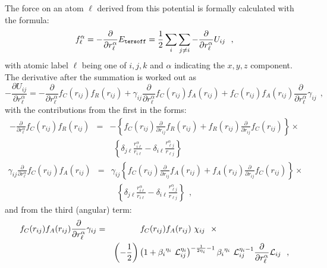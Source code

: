 The force on an atom $\ell$ derived from this potential is
formally calculated with the formula:
\begin{equation}
f_{\ell}^{\alpha} = -\frac{\partial}{\partial r_{\ell}^{\alpha}}
E_{\tt tersoff} = \frac{1}{2} \sum_{i}\sum_{j \neq i}
-\frac{\partial}{\partial r_{\ell}^{\alpha}} U_{ij}~~,
\end{equation}
with atomic label $\ell$ being one of $i,j,k$ and $\alpha$
indicating the $x,y,z$ component.  The derivative after the
summation is worked out as
\begin{equation}
-\frac{\partial U_{ij}}{\partial r_{\ell}^{\alpha}} =
-\frac{\partial}{\partial r_{\ell}^{\alpha}} f_{C}(r_{ij}) f_{R}(r_{ij}) +
 \gamma_{ij} \frac{\partial}{\partial r_{\ell}^{\alpha}} f_{C}(r_{ij}) f_{A}(r_{ij}) +
 f_{C}(r_{ij}) f_{A}(r_{ij}) \frac{\partial}{\partial r_{\ell}^{\alpha}} \gamma_{ij}~~,
\end{equation}
with the contributions from the first in the forms:
\begin{eqnarray}
-\frac{\partial}{\partial r_{\ell}^{\alpha}} f_{C}(r_{ij}) f_{R}(r_{ij})&=&
-\left\{ f_{C}(r_{ij}) \frac{\partial}{\partial r_{ij}} f_{R}(r_{ij}) +
f_{R}(r_{ij}) \frac{\partial}{\partial r_{ij}} f_{C}(r_{ij}) \right\} \times \nonumber \\
& & ~~\left\{ \delta_{j \ell} \frac{r_{i \ell}^{\alpha}}{r_{i \ell}} -
\delta_{i \ell} \frac{r_{\ell j}^{\alpha}}{r_{\ell j}} \right\}
\end{eqnarray}
\begin{eqnarray}
\gamma_{ij} \frac{\partial}{\partial r_{\ell}^{\alpha}} f_{C}(r_{ij}) f_{A}(r_{ij})&=&
\gamma_{ij} \left\{ f_{C}(r_{ij}) \frac{\partial}{\partial r_{ij}} f_{A}(r_{ij}) +
f_{A}(r_{ij}) \frac{\partial}{\partial r_{ij}} f_{C}(r_{ij}) \right\} \times \nonumber \\
& & ~~~\left\{ \delta_{j \ell} \frac{r_{i \ell}^{\alpha}}{r_{i \ell}} -
\delta_{i \ell} \frac{r_{\ell j}^{\alpha}}{r_{\ell j}} \right\}~~,
\end{eqnarray}
and from the third (angular) term:
\begin{eqnarray}
f_{C}(r_{ij}) f_{A}(r_{ij}) \frac{\partial}{\partial r_{\ell}^{\alpha}} \gamma_{ij}&=&
f_{C}(r_{ij}) f_{A}(r_{ij})~\chi_{ij}~~\times ~~~~~~~~~~~~~~~~~~~~~~~~~~ \nonumber \\
& & \left( -\frac{1}{2} \right) \left( 1 + {\beta_{i}}^{\eta_{i}}~{\cal{L}}_{ij}^{\eta_{i}}
\right)^{-\frac{1}{2 \eta_{i}} - 1} {\beta_{i}}^{\eta_{i}}~{\cal{L}}_{ij}^{\eta_{i}-1}
\frac{\partial}{\partial r_{\ell}^{\alpha}} {\cal{L}}_{ij}~~,
\end{eqnarray}
